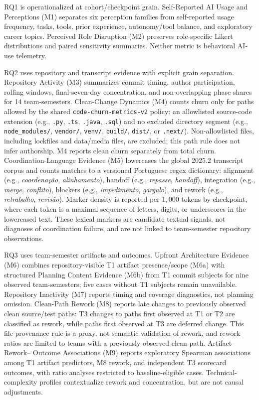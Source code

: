 RQ1 is operationalized at cohort/checkpoint grain. Self-Reported AI Usage and
Perceptions (M1) separates six perception families from self-reported usage
frequency, tasks, tools, prior experience, autonomy/tool balance, and
exploratory career topics. Perceived Role Disruption (M2) preserves
role-specific Likert distributions and paired sensitivity summaries. Neither
metric is behavioral AI-use telemetry.

RQ2 uses repository and transcript evidence with explicit grain separation.
Repository Activity (M3) summarizes commit timing, author participation,
rolling windows, final-seven-day concentration, and non-overlapping phase
shares for 14 team-semesters. Clean-Change Dynamics (M4) counts churn only for
paths allowed by the shared \texttt{code-churn-metrics-v2} policy: an
allowlisted source-code extension (e.g., \texttt{.py}, \texttt{.ts},
\texttt{.java}, \texttt{.sql}) and no excluded directory segment (e.g.,
\texttt{node\_modules/}, \texttt{vendor/}, \texttt{venv/}, \texttt{build/},
\texttt{dist/}, or \texttt{.next/}). Non-allowlisted files, including lockfiles
and data/media files, are excluded; this path rule does not infer authorship.
M4 reports clean churn separately from total churn. Coordination-Language
Evidence (M5) lowercases the global 2025.2 transcript corpus and counts matches
to a versioned Portuguese regex dictionary: alignment (e.g.,
\textit{coordena\c{c}\~ao}, \textit{alinhamento}), handoff (e.g.,
\textit{repasse}, \textit{handoff}), integration (e.g.,
\textit{merge}, \textit{conflito}), blockers (e.g.,
\textit{impedimento}, \textit{gargalo}), and rework (e.g.,
\textit{retrabalho}, \textit{revis\~ao}). Marker density is reported per
$1{,}000$ tokens by checkpoint, where each token is a maximal sequence of
letters, digits, or underscores in the lowercased text. These lexical markers
are candidate textual signals, not diagnoses of coordination failure, and are
not linked to team-semester repository observations.

RQ3 uses team-semester artifacts and outcomes. Upfront Architecture Evidence
(M6) combines repository-visible T1 artifact presence/scope (M6a) with
structured Planning Content Evidence (M6b) from T1 commit subjects for nine
observed team-semesters; five cases without T1 subjects remain unavailable.
Repository Inactivity (M7) reports timing and coverage diagnostics, not
planning omission. Clean-Path Rework (M8) reports late changes to previously
observed clean source/test paths: T3 changes to paths first observed at T1 or
T2 are classified as rework, while paths first observed at T3 are deferred
change. This file-provenance rule is a proxy, not semantic validation of
rework, and rework ratios are limited to teams with a previously observed
clean path. Artifact--Rework--
Outcome Associations (M9) reports exploratory Spearman associations among T1
artifact predictors, M8 rework, and independent T3 scorecard outcomes, with
ratio analyses restricted to baseline-eligible cases. Technical-complexity
profiles contextualize rework and concentration, but are not causal
adjustments.


